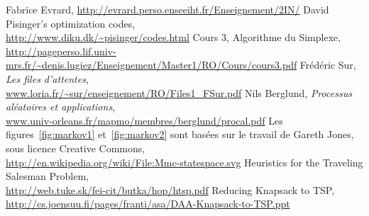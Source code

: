   Fabrice Evrard, \url{http://evrard.perso.enseeiht.fr/Enseignement/2IN/}
  David Pisinger's optimization codes,\\
  \url{http://www.diku.dk/~pisinger/codes.html}
   Cours 3, Algorithme du Simplexe,\\
   \url{http://pageperso.lif.univ-mrs.fr/~denis.lugiez/Enseignement/Master1/RO/Cours/cours3.pdf}
  Frédéric Sur, \emph{Les files d'attentes}, \\
  \url{www.loria.fr/~sur/enseignement/RO/Files1_FSur.pdf}
  Nils Berglund, \emph{Processus aléatoires et applications}, \\
  \url{www.univ-orleans.fr/mapmo/membres/berglund/procal.pdf}
  Les figures~\ref{fig:markov1} et~\ref{fig:markov2} sont basées sur le travail
  de Gareth Jones, sous licence Creative Commons,\\
  \url{http://en.wikipedia.org/wiki/File:Mmc-statespace.svg}
   Heuristics for the Traveling Salesman Problem,\\
   \url{http://web.tuke.sk/fei-cit/butka/hop/htsp.pdf}
   Reducing Knapsack to TSP,\\
   \url{http://cs.joensuu.fi/pages/franti/asa/DAA-Knapsack-to-TSP.ppt}
